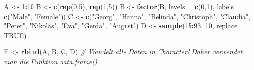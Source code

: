 \documentclass[]{article}
\newenvironment{Shaded}{\begin{snugshade}}{\end{snugshade}}
\newcommand{\KeywordTok}[1]{\textcolor[rgb]{0.13,0.29,0.53}{\textbf{#1}}}
\newcommand{\DataTypeTok}[1]{\textcolor[rgb]{0.13,0.29,0.53}{#1}}
\newcommand{\DecValTok}[1]{\textcolor[rgb]{0.00,0.00,0.81}{#1}}
\newcommand{\StringTok}[1]{\textcolor[rgb]{0.31,0.60,0.02}{#1}}
\newcommand{\CommentTok}[1]{\textcolor[rgb]{0.56,0.35,0.01}{\textit{#1}}}
\newcommand{\OtherTok}[1]{\textcolor[rgb]{0.56,0.35,0.01}{#1}}
\newcommand{\OperatorTok}[1]{\textcolor[rgb]{0.81,0.36,0.00}{\textbf{#1}}}
\newcommand{\NormalTok}[1]{#1}
\begin{document}
\begin{Shaded}
\begin{Highlighting}[]
\NormalTok{    A  <-}\StringTok{ }\DecValTok{1}\OperatorTok{:}\DecValTok{10}
\NormalTok{    B  <-}\StringTok{ }\KeywordTok{c}\NormalTok{(}\KeywordTok{rep}\NormalTok{(}\DecValTok{0}\NormalTok{,}\DecValTok{5}\NormalTok{), }\KeywordTok{rep}\NormalTok{(}\DecValTok{1}\NormalTok{,}\DecValTok{5}\NormalTok{))}
\NormalTok{    B  <-}\StringTok{ }\KeywordTok{factor}\NormalTok{(B, }\DataTypeTok{levels =} \KeywordTok{c}\NormalTok{(}\DecValTok{0}\NormalTok{,}\DecValTok{1}\NormalTok{), }\DataTypeTok{labels =} \KeywordTok{c}\NormalTok{(}\StringTok{"Male"}\NormalTok{, }\StringTok{"Female"}\NormalTok{))}
\NormalTok{    C  <-}\StringTok{ }\KeywordTok{c}\NormalTok{(}\StringTok{"Georg"}\NormalTok{, }\StringTok{"Hanna"}\NormalTok{, }\StringTok{"Belinda"}\NormalTok{, }\StringTok{"Christoph"}\NormalTok{, }\StringTok{"Claudia"}\NormalTok{, }
           \StringTok{"Peter"}\NormalTok{, }\StringTok{"Nikolas"}\NormalTok{, }\StringTok{"Eva"}\NormalTok{, }\StringTok{"Gerda"}\NormalTok{, }\StringTok{"August"}\NormalTok{)}
\NormalTok{    D  <-}\StringTok{ }\KeywordTok{sample}\NormalTok{(}\DecValTok{15}\OperatorTok{:}\DecValTok{93}\NormalTok{, }\DecValTok{10}\NormalTok{, }\DataTypeTok{replace =} \OtherTok{TRUE}\NormalTok{)}
    
\NormalTok{    E  <-}\StringTok{ }\KeywordTok{rbind}\NormalTok{(A, B, C, D) }\CommentTok{# Wandelt alle Daten in Character! Daher verwendet man die Funktion data.frame()}
    

\end{Highlighting}
\end{Shaded}
\end{document}
